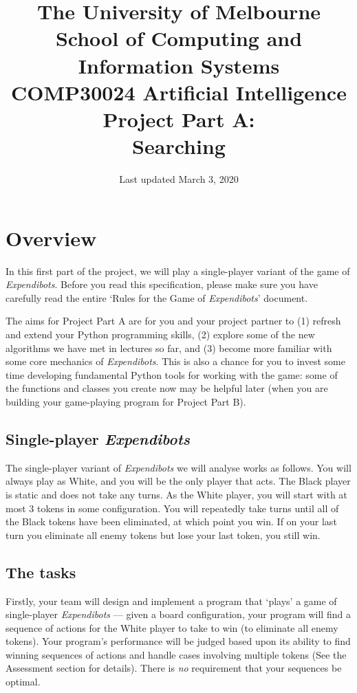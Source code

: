 \documentclass[]{article}
\title{
{\small\sc
    The University of Melbourne\\
    School of Computing and Information Systems\\
    COMP30024 Artificial Intelligence\\[1.5ex]
}
{\LARGE 
    Project Part A:\\[1ex]
}
{\Huge\bf
    Searching
}
}
\author{}
\date{\normalsize Last updated March 3, 2020}
\newcommand{\gameName}{Expendibots}
\begin{document}
\maketitle

\section*{Overview}

In this first part of the project, we will play a single-player variant
of the game of \emph{\gameName}. Before you read this specification,
please make sure you have carefully read the entire `Rules for the Game
of \emph{\gameName}' document.

The aims for Project Part A are for you and your project partner to (1)
refresh and extend your Python programming skills, (2) explore some of
the new algorithms we have met in lectures so far, and (3) become more
familiar with some core mechanics of \emph{\gameName}. This is also a
chance for you to invest some time developing fundamental Python tools
for working with the game: some of the functions and classes you create
now may be helpful later (when you are building your game-playing
program for Project Part B).

\subsection*{Single-player \emph{\gameName}}

The single-player variant of \emph{\gameName} we will analyse works as follows.
You will always play as White, and you will be the only player that acts.
The Black player is static and does not take any turns. As the White player,
you will start with at most 3 tokens in some configuration. You will 
repeatedly take turns until all of the Black tokens have been eliminated, at
which point you win. If on your last turn you eliminate all enemy tokens but
lose your last token, you still win.

\subsection*{The tasks}

Firstly, your team will design and implement a program that `plays' a
game of single-player \emph{\gameName} --- given a board configuration, your
program will find a sequence of actions for the White player to take to win
(to eliminate all enemy tokens). Your program's performance will be judged based
upon its ability to find winning sequences of actions and handle cases involving
multiple tokens (See the Assessment section for details). There is \emph{no} 
requirement that your sequences be optimal.
\end{document}
